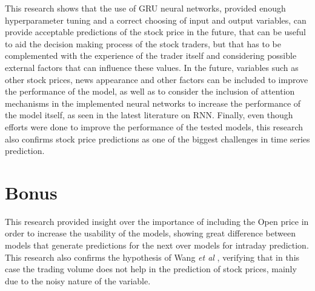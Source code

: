 \documentclass[10pt,twocolumn,letterpaper]{article}
\begin{document}
This research shows that the use of GRU neural networks, provided enough hyperparameter tuning and a correct choosing of input and output variables, can provide acceptable predictions of the stock price in the future, that can be useful to aid the decision making process of the stock traders, but that has to be complemented with the experience of the trader itself and considering possible external factors that can influence these values. 
In the future, variables such as other stock prices, news appearance and other factors can be included to improve the performance of the model, as well as to consider the inclusion of attention mechanisms in the implemented neural networks to increase the performance of the model itself, as seen in the latest literature on RNN. Finally, even though efforts were done to improve the performance of the tested models, this research also confirms stock price predictions as one of the biggest challenges in time series prediction.

\section{Bonus}

This research provided insight over the importance of including the Open price in order to increase the usability of the models, showing great difference between models that generate predictions for the next over models for intraday prediction. This research also confirms the hypothesis of Wang \textit{et al} \cite{Wang2003}, verifying that in this case the trading volume does not help in the prediction of stock prices, mainly due to the noisy nature of the variable.

{\small


}
\end{document}
